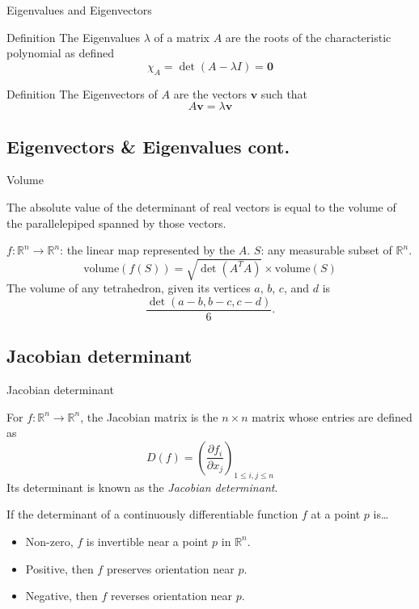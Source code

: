 \documentclass{beamer}
\begin{document}
\begin{frame}{Eigenvalues and Eigenvectors}

    \begin{block}{Definition}
        The Eigenvalues $\lambda$ of a matrix $A$ are the roots of the characteristic polynomial
        as defined
        \[
            \chi_A = \det(A - \lambda I) = \mathbf{0}
        \]
    \end{block}

    \begin{block}{Definition}
        The Eigenvectors of $A$ are the vectors $\mathbf{v}$ such that
        \[
            A\mathbf{v} = \lambda \mathbf{v}
        \]
    \end{block}

\end{frame}

\subsection{Eigenvectors & Eigenvalues cont.}

\begin{frame}{Volume}

    The absolute value of the determinant of real vectors is equal to the volume
    of the parallelepiped spanned by those vectors.

    $f : \mathbb{R}^n \to \mathbb{R}^n$: the linear map represented by the $A$.
    $S$: any measurable subset of $\mathbb{R}^n$.
    \[
        \text{volume}(f(S)) = \sqrt{\det{({A^T}A)}} \times \text{volume}(S)
    \]
    The volume of any tetrahedron, given its vertices $a$, $b$, $c$, and $d$ is
    \[
        \frac{\det(a - b, b - c, c - d)}{6}.
    \]
\end{frame}

\subsection{Jacobian determinant}

\begin{frame}{Jacobian determinant}

    For $f : \mathbb{R}^n \to \mathbb{R}^n$,
    the Jacobian matrix is the $n \times n$ matrix whose entries are defined as
    \[
        D(f) = {\left( \frac{\partial f_i}{\partial x_j} \right)}_{1 \leq i, j \leq n}
    \]
    Its determinant is known as the \emph{Jacobian determinant}.

    \begin{exampleblock}{}
        If the determinant of a continuously differentiable function $f$ at a point $p$ is\dots
        \begin{itemize}
            \item Non-zero, $f$ is invertible near a point $p$ in $\mathbb{R}^n$.
            \item Positive, then $f$ preserves orientation near $p$.
            \item Negative, then $f$ reverses orientation near $p$.
        \end{itemize}
    \end{exampleblock}

\end{frame}
\end{document}
